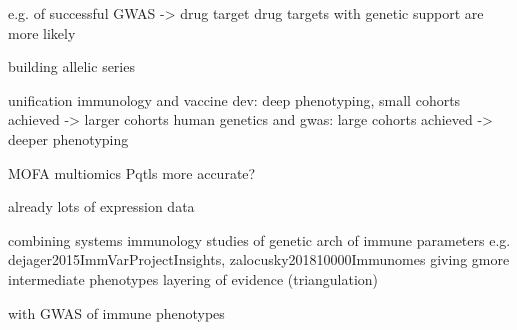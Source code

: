 \begin{outline}

        \3 e.g. of successful GWAS -> drug target
            \4 drug targets with genetic support are more likely

        \3 building allelic series

unification
    immunology and vaccine dev: deep phenotyping, small cohorts achieved -> larger cohorts
    human genetics and gwas: large cohorts achieved -> deeper phenotyping

    MOFA
    multiomics
        Pqtls more accurate?

    already lots of expression data

    combining systems immunology studies of genetic arch of immune parameters
            e.g. dejager2015ImmVarProjectInsights, zalocusky201810000Immunomes
        giving gmore intermediate phenotypes
        layering of evidence (triangulation)

    with GWAS of immune phenotypes

\end{outline}

